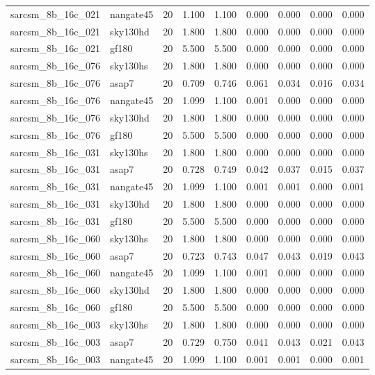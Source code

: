 \begin{tabular}{llrrrrrrr}
sarcsm\_8b\_16c\_021 & nangate45 & 20 & 1.100 & 1.100 & 0.000 & 0.000 & 0.000 & 0.000 \\
sarcsm\_8b\_16c\_021 & sky130hd & 20 & 1.800 & 1.800 & 0.000 & 0.000 & 0.000 & 0.000 \\
sarcsm\_8b\_16c\_021 & gf180 & 20 & 5.500 & 5.500 & 0.000 & 0.000 & 0.000 & 0.000 \\
sarcsm\_8b\_16c\_076 & sky130hs & 20 & 1.800 & 1.800 & 0.000 & 0.000 & 0.000 & 0.000 \\
sarcsm\_8b\_16c\_076 & asap7 & 20 & 0.709 & 0.746 & 0.061 & 0.034 & 0.016 & 0.034 \\
sarcsm\_8b\_16c\_076 & nangate45 & 20 & 1.099 & 1.100 & 0.001 & 0.000 & 0.000 & 0.000 \\
sarcsm\_8b\_16c\_076 & sky130hd & 20 & 1.800 & 1.800 & 0.000 & 0.000 & 0.000 & 0.000 \\
sarcsm\_8b\_16c\_076 & gf180 & 20 & 5.500 & 5.500 & 0.000 & 0.000 & 0.000 & 0.000 \\
sarcsm\_8b\_16c\_031 & sky130hs & 20 & 1.800 & 1.800 & 0.000 & 0.000 & 0.000 & 0.000 \\
sarcsm\_8b\_16c\_031 & asap7 & 20 & 0.728 & 0.749 & 0.042 & 0.037 & 0.015 & 0.037 \\
sarcsm\_8b\_16c\_031 & nangate45 & 20 & 1.099 & 1.100 & 0.001 & 0.001 & 0.000 & 0.001 \\
sarcsm\_8b\_16c\_031 & sky130hd & 20 & 1.800 & 1.800 & 0.000 & 0.000 & 0.000 & 0.000 \\
sarcsm\_8b\_16c\_031 & gf180 & 20 & 5.500 & 5.500 & 0.000 & 0.000 & 0.000 & 0.000 \\
sarcsm\_8b\_16c\_060 & sky130hs & 20 & 1.800 & 1.800 & 0.000 & 0.000 & 0.000 & 0.000 \\
sarcsm\_8b\_16c\_060 & asap7 & 20 & 0.723 & 0.743 & 0.047 & 0.043 & 0.019 & 0.043 \\
sarcsm\_8b\_16c\_060 & nangate45 & 20 & 1.099 & 1.100 & 0.001 & 0.000 & 0.000 & 0.000 \\
sarcsm\_8b\_16c\_060 & sky130hd & 20 & 1.800 & 1.800 & 0.000 & 0.000 & 0.000 & 0.000 \\
sarcsm\_8b\_16c\_060 & gf180 & 20 & 5.500 & 5.500 & 0.000 & 0.000 & 0.000 & 0.000 \\
sarcsm\_8b\_16c\_003 & sky130hs & 20 & 1.800 & 1.800 & 0.000 & 0.000 & 0.000 & 0.000 \\
sarcsm\_8b\_16c\_003 & asap7 & 20 & 0.729 & 0.750 & 0.041 & 0.043 & 0.021 & 0.043 \\
sarcsm\_8b\_16c\_003 & nangate45 & 20 & 1.099 & 1.100 & 0.001 & 0.001 & 0.000 & 0.001 \\

\end{tabular}
